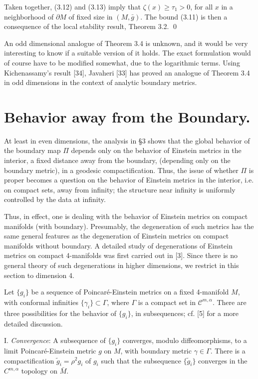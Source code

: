 \documentclass[11pt,amsfonts]{amsart}
\def\endproof{\qed \medskip}
\begin{document}
 Taken together, (3.12) and (3.13) imply that $\zeta(x) \geq \tau_{1} > 0$, 
for all $x$ in a neighborhood of $\partial M$ of fixed size in $(M, \bar g)$. 
The bound (3.11) is then a consequence of the local stability result, 
Theorem 3.2. 
{\endproof}

 An odd dimensional analogue of Theorem 3.4 is unknown, and it would be 
very interesting to know if a suitable version of it holds. The exact 
formulation would of course have to be modified somewhat, due to the 
logarithmic terms. Using Kichenassamy's result [34], Javaheri [33] has 
proved an analogue of Theorem 3.4 in odd dimensions in the context of 
analytic boundary metrics. 


\section{Behavior away from the Boundary.}
\setcounter{equation}{0}

 At least in even dimensions, the analysis in \S 3 shows that the 
global behavior of the boundary map $\Pi$ depends only on the behavior 
of Einstein metrics in the interior, a fixed distance away from the 
boundary, (depending only on the boundary metric), in a geodesic 
compactification. Thus, the issue of whether $\Pi$ is proper becomes a 
question on the behavior of Einstein metrics in the interior, i.e. on 
compact sets, away from infinity; the structure near infinity is 
uniformly controlled by the data at infinity. 

 Thus, in effect, one is dealing with the behavior of Einstein metrics 
on compact manifolds (with boundary). Presumably, the degeneration of 
such metrics has the same general features as the degeneration of 
Einstein metrics on compact manifolds without boundary. A detailed 
study of degenerations of Einstein metrics on compact 4-manifolds was 
first carried out in [3]. Since there is no general theory of such 
degenerations in higher dimensions, we restrict in this section to 
dimension 4. 

 Let $\{g_{i}\}$ be a sequence of Poincar\'e-Einstein metrics on a fixed 
4-manifold $M$, with conformal infinities $\{\gamma_{i}\}\subset\Gamma$, 
where $\Gamma$ is a compact set in ${\mathcal C}^{m,\alpha}$. There are 
three possibilities for the behavior of $\{g_{i}\}$, in subsequences; 
cf. [5] for a more detailed discussion.

 I. {\em Convergence}: A subsequence of $\{g_{i}\}$ converges, modulo 
diffeomorphisms, to a limit Poincar\'e-Einstein metric $g$ on $M$, with 
boundary metric $\gamma\in\Gamma$. There is a compactification 
$\widetilde g_{i} = \rho^{2}g_{i}$ of $g_{i}$ such that the subsequence 
$\{\widetilde g_{i}\}$ converges in the $C^{m,\alpha}$ topology on $\bar M$. 
\end{document}
